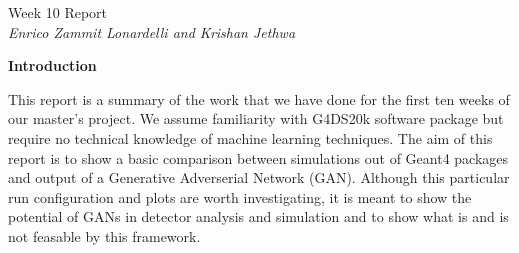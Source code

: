\documentclass[11pt]{article} %
\begin{document}



\begin{center} %

{\Huge Week 10 Report}\\[0.5cm] %
\textit{Enrico Zammit Lonardelli and Krishan Jethwa}\\[0.3cm] %


\end{center}
{\Large \textbf{Introduction}}

This report is a summary of the work that we have done for the first ten weeks of our master's project. We assume familiarity with G4DS20k software package but require no technical knowledge of machine learning techniques. The aim of this report is to show a basic comparison between simulations out of Geant4 packages and output of a Generative Adverserial Network (GAN). Although this particular run configuration and plots are worth investigating, it is meant to show the potential of GANs in detector analysis and simulation and to show what is and is not feasable by this framework.
\end{document}
